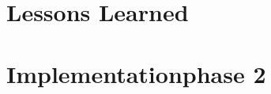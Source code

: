 \documentclass[english,oneside,color]{htldipl}
\begin{document}
\part{Lessons Learned}


\part{Implementationphase 2}




\clearpage
{}






\end{document}
